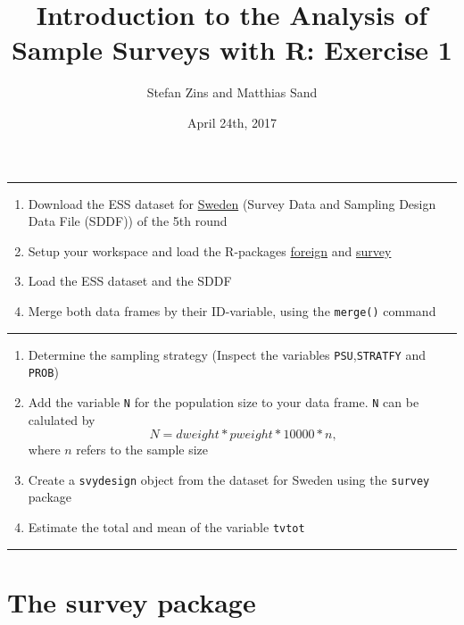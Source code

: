 \documentclass[]{article}
\title{Introduction to the Analysis of Sample Surveys with R: Exercise 1}
\author{Stefan Zins and Matthias Sand}
\date{April 24th, 2017}
\providecommand{\tightlist}{%
  \setlength{\itemsep}{0pt}\setlength{\parskip}{0pt}}
\begin{document}
\maketitle

\begin{center}\rule{0.5\linewidth}{\linethickness}\end{center}

\begin{enumerate}
\def\labelenumi{\arabic{enumi}.}
\tightlist
\item
  Download the ESS dataset for
  \href{http://www.europeansocialsurvey.org/data/country.html?c=sweden}{Sweden}
  (Survey Data and Sampling Design Data File (SDDF)) of the 5th round
\item
  Setup your workspace and load the R-packages
  \href{https://cran.r-project.org/web/packages/foreign/foreign.pdf}{foreign}
  and
  \href{https://cran.r-project.org/web/packages/survey/index.html}{survey}
\item
  Load the ESS dataset and the SDDF
\item
  Merge both data frames by their ID-variable, using the
  \texttt{merge()} command
\end{enumerate}

\begin{center}\rule{0.5\linewidth}{\linethickness}\end{center}

\begin{enumerate}
\def\labelenumi{\arabic{enumi}.}
\setcounter{enumi}{4}
\tightlist
\item
  Determine the sampling strategy (Inspect the variables
  \texttt{PSU},\texttt{STRATFY} and \texttt{PROB})
\item
  Add the variable \texttt{N} for the population size to your data
  frame. \texttt{N} can be calulated by
  \[N= dweight* pweight *10000*n \text{,}\] where \(n\) refers to the
  sample size
\item
  Create a \texttt{svydesign} object from the dataset for Sweden using
  the \texttt{survey} package
\item
  Estimate the total and mean of the variable \texttt{tvtot}
\end{enumerate}

\begin{center}\rule{0.5\linewidth}{\linethickness}\end{center}

\section{The survey package}\label{the-survey-package}
\end{document}
